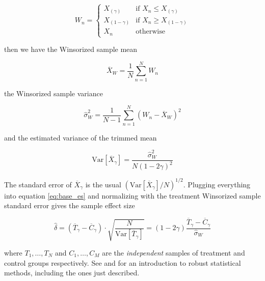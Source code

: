 \documentclass[a4paper]{book}
\begin{document}
\begin{equation}
W_n=\begin{cases}
X_{(\gamma)} & \text{if }X_n\leq X_{(\gamma)} \\
X_{(1-\gamma)} & \text{if }X_n\geq X_{(1-\gamma)} \\
X_n &\text{otherwise}
\end{cases}
\end{equation}

\noindent then we have the Winsorized sample mean

\begin{equation}
\overline{X}_W=\frac{1}{N}\sum_{n=1}^N W_n
\end{equation}

\noindent the Winsorized sample variance

\begin{equation}
\hat{\sigma}^2_W=\frac{1}{N-1}\sum_{n=1}^N (W_n-\overline{X}_W)^2
\end{equation}

\noindent and the estimated variance of the trimmed mean

\begin{equation}
\text{Var}[\overline{X}_\gamma]=\frac{\hat{\sigma}^2_W}{N(1-2\gamma)^2}
\end{equation}

The standard error of $\overline{X}_\gamma$ is the usual $(\text{Var}[\overline{X}_\gamma]/N)^{1/2}$. Plugging everything into equation \ref{eq:base_es} and normalizing with the treatment Winsorized sample standard error gives the sample effect size

\begin{equation}
\label{eq:effect_size}
\hat{\delta}=(\overline{T}_\gamma-\overline{C}_\gamma)\cdot\sqrt{\frac{N}{\text{Var}[\overline{T}_\gamma]}}
=(1-2\gamma)\frac{\overline{T}_\gamma-\overline{C}_\gamma}{\hat{\sigma}_W}
\end{equation}

\noindent where $T_1,\ldots,T_N$ and $C_1,\ldots,C_M$ are the \emph{independent} samples of treatment and control groups respectively. See  \cite{robust_stat} and \cite{modern_stat}for an introduction to robust statistical methods, including the ones just described.
\end{document}
